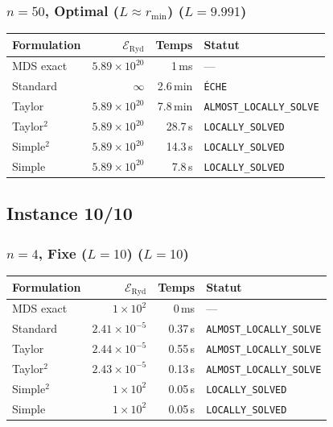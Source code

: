 \subsubsection{$n=50$, Optimal ($L{\approx}r_{\min}$) ($L=9.991$)}
\begin{longtable}{@{}lrrl@{}}
  \toprule
  Formulation & $\mathcal{E}_{\mathrm{Ryd}}$ & Temps & Statut \\
  \midrule
  \endhead
  MDS exact & $5.89\times10^{20}$ & 1\,ms & --- \\
  Standard & $\infty$ & 2.6\,min & \texttt{ÉCHE} \\
  Taylor & $5.89\times10^{20}$ & 7.8\,min & \texttt{ALMOST\_LOCALLY\_SOLVE} \\
  Taylor$^2$ & $5.89\times10^{20}$ & 28.7\,s & \texttt{LOCALLY\_SOLVED} \\
  Simple$^2$ & $5.89\times10^{20}$ & 14.3\,s & \texttt{LOCALLY\_SOLVED} \\
  Simple & $5.89\times10^{20}$ & 7.8\,s & \texttt{LOCALLY\_SOLVED} \\
  \bottomrule
\end{longtable}

\subsection{Instance 10/10}
\subsubsection{$n=4$, Fixe ($L{=}10$) ($L=10$)}
\begin{longtable}{@{}lrrl@{}}
  \toprule
  Formulation & $\mathcal{E}_{\mathrm{Ryd}}$ & Temps & Statut \\
  \midrule
  \endhead
  MDS exact & $1\times10^{2}$ & 0\,ms & --- \\
  Standard & $2.41\times10^{-5}$ & 0.37\,s & \texttt{ALMOST\_LOCALLY\_SOLVE} \\
  Taylor & $2.44\times10^{-5}$ & 0.55\,s & \texttt{ALMOST\_LOCALLY\_SOLVE} \\
  Taylor$^2$ & $2.43\times10^{-5}$ & 0.13\,s & \texttt{ALMOST\_LOCALLY\_SOLVE} \\
  Simple$^2$ & $1\times10^{2}$ & 0.05\,s & \texttt{LOCALLY\_SOLVED} \\
  Simple & $1\times10^{2}$ & 0.05\,s & \texttt{LOCALLY\_SOLVED} \\
  \bottomrule
\end{longtable}


